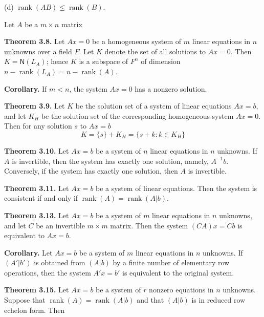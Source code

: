 \documentclass{article}
\newcommand{\0}{\mathit{0}}
\begin{document}
(d) $\operatorname{rank}(AB) \leq \operatorname{rank}(B)$.

\medskip

Let $A$ be a $m\times n$ matrix

\textbf{Theorem 3.8.} Let $Ax = 0$ be a homogeneous system of $m$ linear  
equations in $n$ unknowns over a field $F$. Let $K$ denote the set of all  
solutions to $Ax = 0$. Then $K = \mathsf{N}(L_A)$; hence $K$ is a subspace  
of $F^n$ of dimension  
$n - \operatorname{rank}(L_A) = n - \operatorname{rank}(A)$.

\medskip

\textbf{Corollary.} If $m < n$, the system $Ax = 0$ has a nonzero solution.

\medskip

\textbf{Theorem 3.9.} Let $K$ be the solution set of a system of linear equations  
$Ax = b$, and let $K_H$ be the solution set of the corresponding homogeneous  
system $Ax = 0$. Then for any solution $s$ to $Ax = b$  
\[K = \{s\} + K_H = \{s + k : k \in K_H\}\]

\medskip

\textbf{Theorem 3.10.} Let $Ax = b$ be a system of $n$ linear equations in  
$n$ unknowns. If $A$ is invertible, then the system has exactly one solution,  
namely, $A^{-1}b$. Conversely, if the system has exactly one solution, then  
$A$ is invertible.

\medskip

\textbf{Theorem 3.11.} Let $Ax = b$ be a system of linear equations. Then the  
system is consistent if and only if $\operatorname{rank}(A) = \operatorname{rank}(A|b)$.

\medskip

\textbf{Theorem 3.13.} Let $Ax = b$ be a system of $m$ linear equations in $n$
unknowns, and let $C$ be an invertible $m \times m$ matrix.
Then the system
$(CA)x = Cb$ is equivalent to $Ax = b$.

\medskip

\textbf{Corollary.} Let $Ax = b$ be a system of $m$ linear equations in $n$  
unknowns. If $(A'|b')$ is obtained from $(A|b)$ by a finite number of  
elementary row operations, then the system $A'x = b'$ is equivalent to the  
original system.

\medskip

\textbf{Theorem 3.15.} Let $Ax = b$ be a system of $r$ nonzero equations in $n$  
unknowns. Suppose that $\operatorname{rank}(A) = \operatorname{rank}(A|b)$ and that  
$(A|b)$ is in reduced row echelon form. Then  
\end{document}
